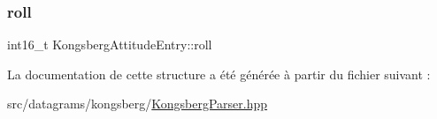 \subsubsection{\texorpdfstring{roll}{roll}}
{\footnotesize\ttfamily int16\+\_\+t Kongsberg\+Attitude\+Entry\+::roll}



La documentation de cette structure a été générée à partir du fichier suivant \+:\begin{DoxyCompactItemize}
\item 
src/datagrams/kongsberg/\hyperlink{KongsbergParser_8hpp}{Kongsberg\+Parser.\+hpp}\end{DoxyCompactItemize}
